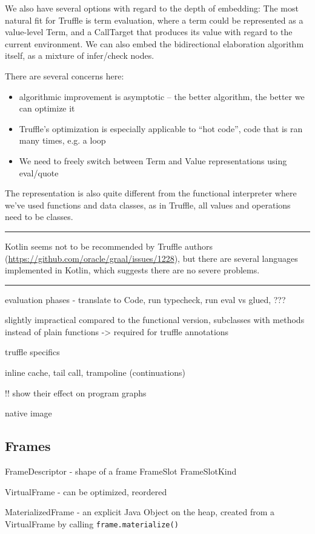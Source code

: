 \documentclass[english,zadani,odsaz]{fitthesis}
\begin{document}
We also have several options with regard to the depth of embedding: The most
natural fit for Truffle is term evaluation, where a term could be represented as
a value-level Term, and a CallTarget that produces its value with regard to the
current environment. We can also embed the bidirectional elaboration algorithm
itself, as a mixture of infer/check nodes.

There are several concerns here:
\begin{itemize}
\item algorithmic improvement is asymptotic -- the better algorithm, the better we
can optimize it
\item Truffle's optimization is especially applicable to ``hot code'', code that is
ran many times, e.g. a loop
\item We need to freely switch between Term and Value representations using
eval/quote
\end{itemize}

The representation is also quite different from the functional interpreter where
we've used functions and data classes, as in Truffle, all values and operations
need to be classes.

\noindent\rule{\textwidth}{0.5pt}

Kotlin seems not to be recommended by Truffle authors
(\url{https://github.com/oracle/graal/issues/1228}), but there are several languages
implemented in Kotlin, which suggests there are no severe problems.

\noindent\rule{\textwidth}{0.5pt}

evaluation phases - translate to Code, run typecheck, run eval vs glued, ???

slightly impractical compared to the functional version, subclasses with methods
instead of plain functions -> required for truffle annotations

truffle specifics

inline cache, tail call, trampoline (continuations)

!! show their effect on program graphs

native image

\subsection{Frames}
\label{sec:orgff1edf6}
FrameDescriptor - shape of a frame
FrameSlot
FrameSlotKind

VirtualFrame - can be optimized, reordered

MaterializedFrame - an explicit Java Object on the heap, created from a
VirtualFrame by calling \texttt{frame.materialize()}
\end{document}
